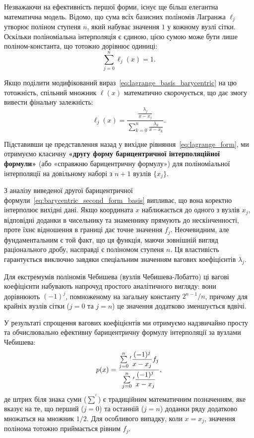 Незважаючи на ефективність першої форми, існує ще більш елегантна математична модель. Відомо, що сума всіх базисних поліномів Лагранжа $\ell_j$ утворює поліном ступеня $n$, який набуває значення $1$ у кожному вузлі сітки. Оскільки поліноміальна інтерполяція є єдиною, цією сумою може бути лише поліном-константа, що тотожно дорівнює одиниці:
\begin{equation}\label{eq:lagrange_sum_one}
	\sum_{j=0}^{n} \ell_j(x) = 1.
\end{equation}

Якщо поділити модифікований вираз~\eqref{eq:lagrange_basis_barycentric} на цю тотожність, спільний множник $\ell(x)$ математично скорочується, що дає змогу вивести фінальну залежність:
\begin{equation}\label{eq:barycentric_second_form_basis}
	\ell_j(x) = \frac{\frac{\lambda_j}{x - x_j}}{\sum_{k=0}^{n} \frac{\lambda_k}{x - x_k}}.
\end{equation}

Підставивши це представлення назад у вихідне рівняння~\eqref{eq:lagrange_form}, ми отримуємо класичну \textbf{«другу форму барицентричної інтерполяційної формули»} (або «справжню барицентричну формулу») для поліноміальної інтерполяції на довільному наборі з $n+1$ вузлів $\{x_j\}$.

З аналізу виведеної другої барицентричної формули~\eqref{eq:barycentric_second_form_basis} випливає, що вона коректно інтерполює вихідні дані. Якщо координата $x$ наближається до одного з вузлів $x_j$, відповідні доданки в чисельнику та знаменнику прямують до нескінченності, проте їхнє відношення в границі дає точне значення $f_j$. Неочевидним, але фундаментальним є той факт, що ця функція, маючи зовнішній вигляд раціонального дробу, насправді є поліномом ступеня $n$. Ця властивість гарантується виключно завдяки спеціальним значенням вагових коефіцієнтів $\lambda_j$. 

Для екстремумів поліномів Чебишева (вузлів Чебишева-Лобатто) ці вагові коефіцієнти набувають напрочуд простого аналітичного вигляду: вони дорівнюють $(-1)^j$, помноженому на загальну константу $2^{n-1}/n$, причому для крайніх вузлів сітки ($j = 0$ та $j = n$) це значення додатково зменшується вдвічі.

%
У результаті спрощення вагових коефіцієнтів ми отримуємо надзвичайно просту та обчислювально ефективну барицентричну формулу інтерполяції за вузлами Чебишева:
\begin{equation}\label{eq:cheb_barycentric}
	p(x) = \frac{\sum\limits_{j=0}^{n} \vphantom{\sum}^{\prime} \dfrac{(-1)^j}{x - x_j} f_j}{\sum\limits_{j=0}^{n} \vphantom{\sum}^{\prime} \dfrac{(-1)^j}{x - x_j}},
\end{equation}
де штрих біля знака суми ($\sum^{\prime}$) є традиційним математичним позначенням, яке вказує на те, що перший ($j=0$) та останній ($j=n$) доданки ряду додатково множаться на множник $1/2$. Для особливого випадку, коли $x = x_j$, значення полінома тотожно приймається рівним $f_j$.


